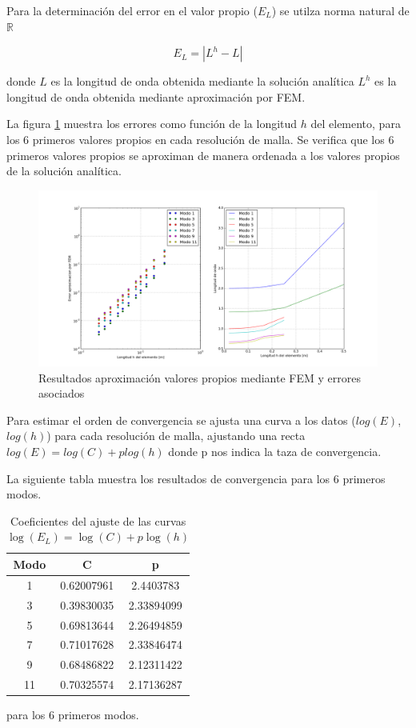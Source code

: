 Para la determinaci\'on del error en el valor propio ($E_L$) se utilza norma natural de $\mathbb{R}$

$$E_L = |L^h - L|$$

donde $L$ es la longitud de onda obtenida mediante la soluci\'on anal\'itica $L^h$ es la longitud de onda obtenida mediante aproximaci\'on por FEM.

La figura \ref{fig:valores_propios} muestra los errores como funci\'on de la longitud $h$ del elemento, para los 6 primeros valores propios en cada resoluci\'on de malla. Se verifica que los 6 primeros valores propios se aproximan de manera ordenada a los valores propios de la soluci\'on anal\'itica.

\begin{figure}
  \centering
  \includegraphics[width=17cm]{figuras/valores_propiosFEM.png}
  \caption{ Resultados aproximaci\'on valores propios mediante FEM y errores asociados}  
  \label{fig:valores_propios}
\end{figure}

Para estimar el orden de convergencia se ajusta una curva a los datos ($log(E)$, $log(h)$) para cada resoluci\'on de malla, ajustando una recta $log(E) = log(C) + p log(h)$ donde p nos indica la taza de convergencia.

La siguiente tabla muestra los resultados de convergencia para los 6 primeros modos.

\begin{table}[h]
\centering
\begin{tabular}{|c|c|c|}
\hline 
Modo & C & p \\ 
\hline 
1 & 0.62007961 & 2.4403783 \\
\hline 
3 & 0.39830035 & 2.33894099 \\ 
\hline 
5 & 0.69813644 & 2.26494859 \\  
\hline 
7 & 0.71017628 & 2.33846474 \\ 
\hline 
9 & 0.68486822 & 2.12311422 \\  
\hline 
11 &  0.70325574 & 2.17136287 \\
\hline 
\end{tabular} 
\caption{Coeficientes del ajuste de las curvas $\log(E_L)=\log(C)+p\log(h)$} para los 6 primeros modos.
\label{tabla:EL}
\end{table}

